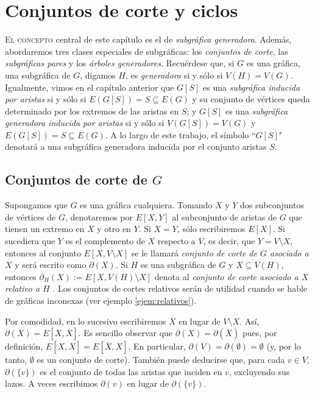 \usepackage{}\chapter{Conjuntos de corte y ciclos}

\lettrine[lines=5] {\initfamily \selectfont E} {l concepto} central de este capítulo es el de \textit{subgráfica generadora}. Además, abordaremos tres clases especiales de subgráficas: los \textit{conjuntos de corte}, las \textit{subgráficas pares} y los \textit{árboles generadores}. Recuérdese que, si $G$ es una gráfica, una subgráfica de $G$, digamos $H$, es \textit{generadora} si y sólo si $V(H)=V(G)$. Igualmente, vimos en el capítulo anterior que $G[S]$ es una \textit{subgráfica inducida por aristas} si y sólo si $E(G[S]) = S\subseteq E(G)$ y su conjunto de vértices queda determinado por los extremos de las aristas en $S$; y $G[S]$ es una \textit{subgráfica generadora inducida por aristas} si y sólo si $V(G[S]) = V(G)$ y $E(G[S]) = S\subseteq E(G)$. A lo largo de este trabajo, el símbolo ``$G[S]$" denotará a una subgráfica generadora inducida por el conjunto aristas $S$. 



\section{Conjuntos de corte de $G$}

Supongamos que $G$ es una gráfica cualquiera. Tomando $X$ y $Y$ dos subconjuntos de vértices de $G$, denotaremos por $E[X,Y]$ al subconjunto de aristas de $G$ que tienen un extremo en $X$ y otro en $Y$. Si $X = Y$, sólo escribiremos $E[X]$. Si sucediera que $Y$ es el complemento de $X$ respecto a $V$, es decir, que $Y=V \setminus X$, entonces al conjunto $E[X, V \setminus X]$ se le llamará \textit{conjunto de corte de $G$ asociado a $X$}  y será escrito como $\partial(X)$. Si $H$ es una subgráfica de $G$ y $X \subseteq V(H)$, entonces $\partial_{H}(X):= E[X, V(H)\setminus X]$ denota al \textit{conjunto de corte asociado a $X$ relativo a $H$}  . Los conjuntos de cortes relativos serán de utilidad cuando se hable de gráficas inconexas (ver ejemplo \ref{ejem:relativos}).

Por comodidad, en lo sucesivo escribiremos $\overline{X}$ en lugar de $V \setminus X$. Así, $\partial(X) = E[X,\overline{X}]$. Es sencillo observar que $\partial(X) = \partial(\overline{X})$ pues, por definición, $E[X,\overline{X}] = E[\overline{X},X]$. En particular, $\partial(V)=\partial(\emptyset) = \emptyset$ (y, por lo tanto, $\emptyset$ es un conjunto de corte). También puede deducirse que, para cada  $v \in V$, $\partial(\{v\})$ es el conjunto de todas las aristas que inciden en $v$, excluyendo sus lazos.  A veces escribimos $\partial(v)$ en lugar de $\partial(\{v\})$.

